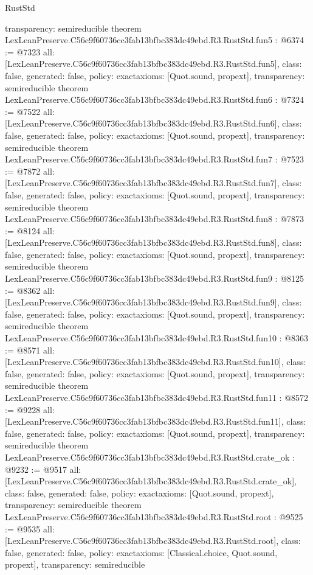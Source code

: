 \begin{lexlean}{RustStd}
\begin{coremodule}
{  transparency: semireducible
}
theorem LexLeanPreserve.C56c9f60736cc3fab13bfbc383dc49ebd.R3.RustStd.fun5 : @6374 := @7323 {
  all: [LexLeanPreserve.C56c9f60736cc3fab13bfbc383dc49ebd.R3.RustStd.fun5],
  class: false,
  generated: false,
  policy: exact{axioms: [Quot.sound, propext]},
  transparency: semireducible
}
theorem LexLeanPreserve.C56c9f60736cc3fab13bfbc383dc49ebd.R3.RustStd.fun6 : @7324 := @7522 {
  all: [LexLeanPreserve.C56c9f60736cc3fab13bfbc383dc49ebd.R3.RustStd.fun6],
  class: false,
  generated: false,
  policy: exact{axioms: [Quot.sound, propext]},
  transparency: semireducible
}
theorem LexLeanPreserve.C56c9f60736cc3fab13bfbc383dc49ebd.R3.RustStd.fun7 : @7523 := @7872 {
  all: [LexLeanPreserve.C56c9f60736cc3fab13bfbc383dc49ebd.R3.RustStd.fun7],
  class: false,
  generated: false,
  policy: exact{axioms: [Quot.sound, propext]},
  transparency: semireducible
}
theorem LexLeanPreserve.C56c9f60736cc3fab13bfbc383dc49ebd.R3.RustStd.fun8 : @7873 := @8124 {
  all: [LexLeanPreserve.C56c9f60736cc3fab13bfbc383dc49ebd.R3.RustStd.fun8],
  class: false,
  generated: false,
  policy: exact{axioms: [Quot.sound, propext]},
  transparency: semireducible
}
theorem LexLeanPreserve.C56c9f60736cc3fab13bfbc383dc49ebd.R3.RustStd.fun9 : @8125 := @8362 {
  all: [LexLeanPreserve.C56c9f60736cc3fab13bfbc383dc49ebd.R3.RustStd.fun9],
  class: false,
  generated: false,
  policy: exact{axioms: [Quot.sound, propext]},
  transparency: semireducible
}
theorem LexLeanPreserve.C56c9f60736cc3fab13bfbc383dc49ebd.R3.RustStd.fun10 : @8363 := @8571 {
  all: [LexLeanPreserve.C56c9f60736cc3fab13bfbc383dc49ebd.R3.RustStd.fun10],
  class: false,
  generated: false,
  policy: exact{axioms: [Quot.sound, propext]},
  transparency: semireducible
}
theorem LexLeanPreserve.C56c9f60736cc3fab13bfbc383dc49ebd.R3.RustStd.fun11 : @8572 := @9228 {
  all: [LexLeanPreserve.C56c9f60736cc3fab13bfbc383dc49ebd.R3.RustStd.fun11],
  class: false,
  generated: false,
  policy: exact{axioms: [Quot.sound, propext]},
  transparency: semireducible
}
theorem LexLeanPreserve.C56c9f60736cc3fab13bfbc383dc49ebd.R3.RustStd.crate_ok : @9232 := @9517 {
  all: [LexLeanPreserve.C56c9f60736cc3fab13bfbc383dc49ebd.R3.RustStd.crate_ok],
  class: false,
  generated: false,
  policy: exact{axioms: [Quot.sound, propext]},
  transparency: semireducible
}
theorem LexLeanPreserve.C56c9f60736cc3fab13bfbc383dc49ebd.R3.RustStd.root : @9525 := @9535 {
  all: [LexLeanPreserve.C56c9f60736cc3fab13bfbc383dc49ebd.R3.RustStd.root],
  class: false,
  generated: false,
  policy: exact{axioms: [Classical.choice, Quot.sound, propext]},
  transparency: semireducible
}


\end{coremodule}
\end{lexlean}
